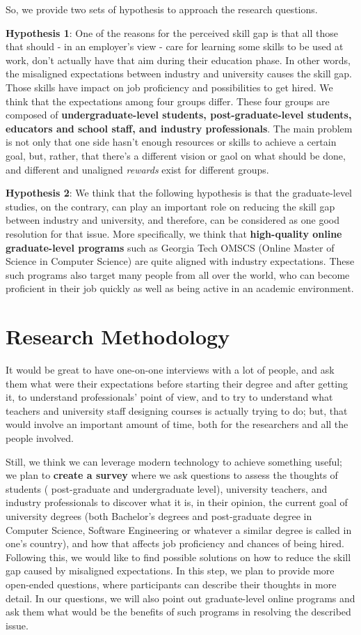 \documentclass{sigchi}
\begin{document}
So, we provide two sets of hypothesis to approach the research questions.

\textbf{Hypothesis 1}: One of the reasons for the perceived skill gap is that all those that should - in an employer's view - care for learning some skills to be used at work, don't actually have that aim during their education phase. In other words, the misaligned expectations between industry and university causes the skill gap. Those skills have impact on job proficiency and possibilities to get hired. We think that the expectations among four groups differ. These four groups are composed of \textbf{undergraduate-level students, post-graduate-level students, educators and school staff, and industry professionals}. The main problem is not only that one side hasn’t enough resources or skills to achieve a certain goal, but, rather, that there’s a different vision or gaol on what should be done, and different and unaligned \textit{rewards} exist for different groups.  

\textbf{Hypothesis 2}:  We think that the following hypothesis is that the graduate-level studies, on the contrary, can play an important role on reducing the skill gap between industry and university, and therefore, can be considered as one good resolution for that issue. More specifically, we think that \textbf{high-quality online graduate-level programs} such as Georgia Tech OMSCS (Online Master of Science in Computer Science) are quite aligned with industry expectations. These such programs also target many people from all over the world, who can become proficient in their job quickly as well as being active in an academic environment.

\section{Research Methodology}
It would be great to have one-on-one interviews with a lot of people, and ask them what were their expectations before starting their degree and after getting it, to understand professionals' point of view, and to try to understand what teachers and university staff designing courses is actually trying to do; but, that would involve an important amount of time, both for the researchers and all the people involved.

Still, we think we can leverage modern technology to achieve something useful; we plan to \textbf{create a survey} where we ask questions to assess the thoughts of students ( post-graduate and undergraduate level), university teachers, and industry professionals to discover what it is, in their opinion, the current goal of university degrees (both Bachelor's degrees and post-graduate degree in Computer Science, Software Engineering or whatever a similar degree is called in one's country), and how that affects job proficiency and chances of being hired. Following this, we would like to find possible solutions on how to reduce the skill gap caused by misaligned expectations. In this step, we plan to provide more open-ended questions, where participants can describe their thoughts in more detail. In our questions, we will also point out graduate-level online programs and ask them what would be the benefits of such programs in resolving the described issue.
\end{document}
